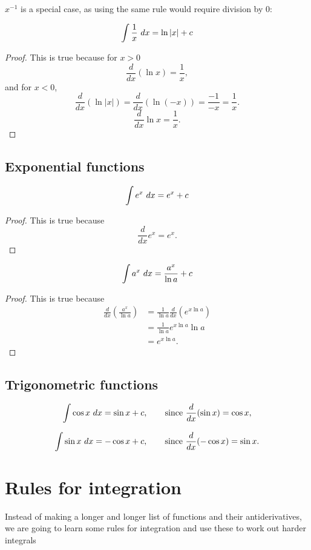 $x^{-1}$ is a special case, as using the same rule would require division by 0:

\begin{in_a_box}
\[\int \frac{1}{x}\ dx = \ln |x|+c\]
\begin{proof}
This is true because for $x>0$
\[\frac{d}{dx}(\ln x)=\frac{1}{x},\]
and for $x<0$,
\[\frac{d}{dx}(\ln |x|)=\frac{d}{dx}(\ln (-x))=\frac{-1}{-x}=\frac{1}{x}.\]
\[\frac{d}{dx}\ln x=\frac{1}{x}.\]
\end{proof}
\end{in_a_box}



\subsection{Exponential functions}

\begin{in_a_box}
\[\int e^x\ dx = e^x+c\]
\begin{proof}
This is true because \[\frac{d}{dx}e^x=e^x.\]
\end{proof}
\end{in_a_box}

\begin{in_a_box}
\[\int a^x\ dx = \frac{a^x}{\ln a}+c\]
\begin{proof}
This is true because 
\begin{align*}
\frac{d}{dx}\left(\frac{a^x}{\ln a}\right)&=\frac{1}{\ln a}\frac{d}{dx}\left(e^{x\ln a}\right)\\
&=\frac{1}{\ln a}e^{x\ln a}\ln a\\
&=e^{x\ln a}.
\end{align*}
\end{proof}
\end{in_a_box}


\subsection{Trigonometric functions}
\begin{in_a_box}
\[\int \cos x\ dx=\sin x + c,\quad\quad \text{since }\frac{d}{dx}(\sin x)=\cos x,\]
\end{in_a_box}
\begin{in_a_box}
\[\int \sin x\ dx=-\cos x + c,\quad\quad \text{since }\frac{d}{dx}(-\cos x)=\sin x.\]
\end{in_a_box}


\section{Rules for integration}
Instead of making a longer and longer list of functions and their antiderivatives, we are going to learn some rules for integration and use these
to work out harder integrals

